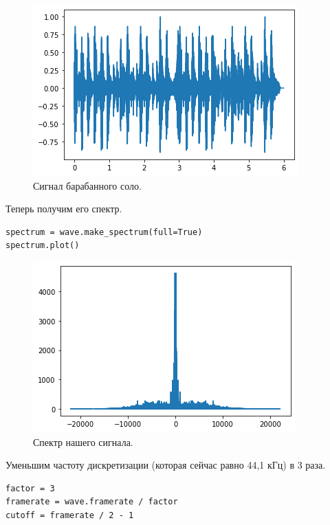 \documentclass[a4paper, 14pt]{extarticle}
\begin{document}
    \begin{figure}[h]
        \centering
        \includegraphics[width=0.8\linewidth]{resources/Images/task3_wave}
        \caption{Сигнал барабанного соло.}
        \label{fig:task3_wave}
    \end{figure}

    Теперь получим его спектр.

    \begin{lstlisting}[caption= Получение спектра., label={lst:task3_spectrum}]
spectrum = wave.make_spectrum(full=True)
spectrum.plot()     \end{lstlisting}

    \begin{figure}[H]
        \centering
        \includegraphics[width=0.8\linewidth]{resources/Images/task3_spectrum}
        \caption{Спектр нашего сигнала.}
        \label{fig:task3_spectrum}
    \end{figure}

    Уменьшим частоту дискретизации (которая сейчас равно 44,1 кГц) в 3 раза.

    \begin{lstlisting}[caption= Уменьшение частоты дискретизации., label={lst:task3_spectrum}]
factor = 3
framerate = wave.framerate / factor
cutoff = framerate / 2 - 1      \end{lstlisting}
\end{document}

